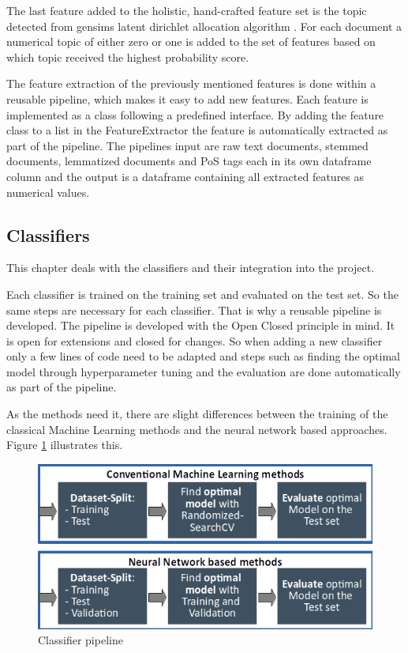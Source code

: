 The last feature added to the holistic, hand-crafted feature set is the topic detected from gensims latent dirichlet allocation algorithm \cite{Fortuna2018}. For each document a numerical topic of either zero or one is added to the set of features based on which topic received the highest probability score. 

The feature extraction of the previously mentioned features is done within a reusable pipeline, which makes it easy to add new features. Each feature is implemented as a class following a predefined interface. By adding the feature class to a list in the Feature\-Extractor the feature is automatically extracted as part of the pipeline. The pipelines input are raw text documents, stemmed documents, lemmatized documents and PoS tags each in its own dataframe column and the output is a dataframe containing all extracted features as numerical values.

\subsection{Classifiers}
\label{ch:approachD}

This chapter deals with the classifiers and their integration into the project.

Each classifier is trained on the training set and evaluated on the test set. So the same steps are necessary for each classifier. That is why a reusable pipeline is developed. The pipeline is developed with the Open Closed principle in mind. It is open for extensions and closed for changes. So when adding a new classifier only a few lines of code need to be adapted and steps such as finding the optimal model through hyperparameter tuning and the evaluation are done automatically as part of the pipeline.

As the methods need it, there are slight differences between the training of the classical Machine Learning methods and the neural network based approaches. Figure \ref{fig:classifier_pipeline} illustrates this.

\begin{figure}[ht]
	\centering
	\includegraphics[width=0.7\linewidth]{figures/classifier_pipeline.png}
	\caption{Classifier pipeline}
	\label{fig:classifier_pipeline}
\end{figure}

